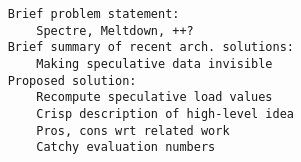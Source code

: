 \begin{verbatim}
    Brief problem statement: 
        Spectre, Meltdown, ++?
    Brief summary of recent arch. solutions: 
        Making speculative data invisible
    Proposed solution: 
        Recompute speculative load values
        Crisp description of high-level idea
        Pros, cons wrt related work
        Catchy evaluation numbers
\end{verbatim}
